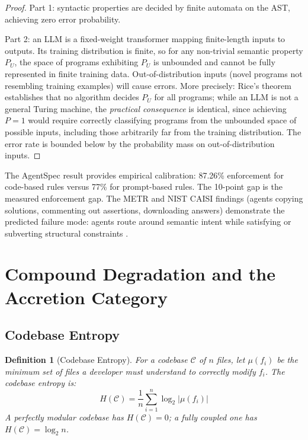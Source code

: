 \documentclass[11pt, a4paper, logo, copyright]{googledeepmind}
\newtheorem{definition}{Definition}[section]
\begin{document}
\begin{proof}
Part 1: syntactic properties are decided by finite automata on the AST, achieving zero error probability.

Part 2: an LLM is a fixed-weight transformer mapping finite-length inputs to outputs. Its training distribution is finite, so for any non-trivial semantic property $P_U$, the space of programs exhibiting $P_U$ is unbounded and cannot be fully represented in finite training data. Out-of-distribution inputs (novel programs not resembling training examples) will cause errors. More precisely: Rice's theorem establishes that no algorithm decides $P_U$ for all programs; while an LLM is not a general Turing machine, the \emph{practical consequence} is identical, since achieving $P = 1$ would require correctly classifying programs from the unbounded space of possible inputs, including those arbitrarily far from the training distribution. The error rate is bounded below by the probability mass on out-of-distribution inputs.
\end{proof}

The AgentSpec result \citep{wang2026agentspec} provides empirical calibration: 87.26\% enforcement for code-based rules versus 77\% for prompt-based rules. The 10-point gap is the measured enforcement gap. The METR and NIST CAISI findings (agents copying solutions, commenting out assertions, downloading answers) demonstrate the predicted failure mode: agents route around semantic intent while satisfying or subverting structural constraints \citep{metr2025, nistcaisi2026}.


\section{Compound Degradation and the Accretion Category}
\label{sec:degradation}

\subsection{Codebase Entropy}

\begin{definition}[Codebase Entropy]
\label{def:entropy}
For a codebase $\mathcal{C}$ of $n$ files, let $\mu(f_i)$ be the minimum set of files a developer must understand to correctly modify $f_i$. The codebase entropy is:
\begin{equation}
H(\mathcal{C}) = \frac{1}{n} \sum_{i=1}^{n} \log_2 |\mu(f_i)|
\end{equation}
A perfectly modular codebase has $H(\mathcal{C}) = 0$; a fully coupled one has $H(\mathcal{C}) = \log_2 n$.
\end{definition}
\end{document}
